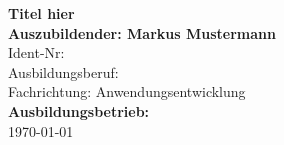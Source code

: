 \documentclass[pdftex,10pt,a4paper,appendixprefix,listof=numbered,bibliography=totocnumbered]{scrreprt}
\begin{document}
\begin{titlepage}
 \begin{center}
	\huge
	\textbf{Titel hier} %
	\bigskip\\
	\large
	\textbf{Auszubildender: Markus Mustermann}\\   %
	Ident-Nr: \\
	Ausbildungsberuf: \\
	Fachrichtung: Anwendungsentwicklung %
	\bigskip\\
   \textbf{Ausbildungsbetrieb: } %
	\bigskip\\
	\today
\end{center}
\end{titlepage}
\newpage
{}
\tableofcontents
\newpage
{}







\newpage
\appendix
	\newpage
	
	\newpage
	
	\newpage

	\printglossary
	\newpage
	\listoftables
	\listoffigures
	\newpage
	
	\newpage
	
	
\end{document}

